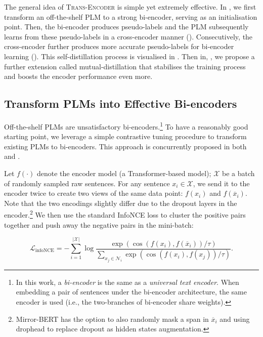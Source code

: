 \documentclass{article} \usepackage{iclr2021_conference,times}
\newcommand{\modelname}{\textsc{Trans-Encoder}\xspace}
\begin{document}
The general idea of \modelname is simple yet extremely effective. 
In , we first transform an off-the-shelf PLM to a strong bi-encoder, serving as an initialisation point. 
Then, the bi-encoder produces pseudo-labels and the PLM subsequently learns from these pseudo-labels in a cross-encoder manner (). 
Consecutively, the cross-encoder further produces more accurate pseudo-labels for bi-encoder learning (). 
This self-distillation process is visualised in . 
Then in, , we propose a further extension called mutual-distillation that stabilises the training process and boosts the encoder performance even more.

\subsection{Transform PLMs into Effective Bi-encoders}\label{sec:mirror_bert}
Off-the-shelf PLMs are unsatisfactory bi-encoders.\footnote{In this work, a \textit{bi-encoder} is the same as a \textit{universal text encoder}. When embedding a pair of sentences under the bi-encoder architecture, the same encoder is used (i.e., the two-branches of bi-encoder share weights).} 
To have a reasonably good starting point, we leverage a simple contrastive tuning procedure to transform existing PLMs to bi-encoders. 
This approach is concurrently proposed in both \citep{liu2021fast} and \citep{gao2021simcse}. 

Let $f(\cdot)$ denote the encoder model (a Transformer-based model); $\mathcal{X}$ be a batch of randomly sampled raw sentences. 
For any sentence $x_i\in\mathcal{X}$, we send it to the encoder twice to create two views of the same data point: $f(x_i)$ and $f(\overline{x}_i)$. 
Note that the two encodings slightly differ due to the dropout layers in the encoder.\footnote{Mirror-BERT has the option to also randomly mask a span in $\overline{x}_i$ and using drophead \citep{zhou-etal-2020-scheduled} to replace dropout as hidden states augmentation.}
We then use the standard InfoNCE loss \citep{oord2018representation} to cluster the positive pairs together and push away the negative pairs in the mini-batch:

\vspace{-2mm}
\begin{equation}
    \mathcal{L}_{\text{infoNCE}} = -\sum_{i=1}^{|\mathcal{X}|}\log\frac{\exp(\cos(f(x_i), f(\overline{x}_i))/\tau)}{\displaystyle \sum_{x_j\in \mathcal{N}_i}\exp(\cos(f(x_i), f(x_j))/\tau)}.
    \label{eq:infonce}
\end{equation}
\end{document}
